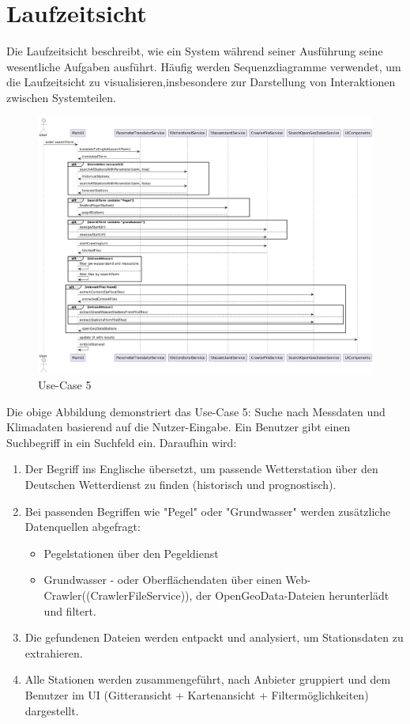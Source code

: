 \documentclass[a4paper,12pt]{scrreprt}
\begin{document}
\section*{\large \textbf{Laufzeitsicht}}
Die Laufzeitsicht beschreibt, wie ein System während seiner Ausführung seine wesentliche Aufgaben ausführt. Häufig werden Sequenzdiagramme verwendet, um die Laufzeitsicht zu visualisieren,insbesondere zur Darstellung von Interaktionen zwischen Systemteilen.
\begin{figure}[H]
	\includegraphics[width=18.5cm]{Such-Algorithmus.png}
	\caption{\label{} Use-Case 5}
\end{figure}
Die obige Abbildung demonstriert das Use-Case 5: Suche nach Messdaten und Klimadaten basierend auf die Nutzer-Eingabe. Ein Benutzer gibt einen Suchbegriff in ein Suchfeld ein. Daraufhin wird:  
\begin{enumerate}
	\item Der Begriff ins Englische übersetzt, um passende Wetterstation über den Deutschen Wetterdienst zu finden (historisch und prognostisch).
	\item Bei passenden Begriffen wie "Pegel" oder "Grundwasser" werden zusätzliche Datenquellen abgefragt:
	\begin{itemize}
		\item Pegelstationen über den Pegeldienst
		\item Grundwasser - oder Oberflächendaten über einen Web-Crawler((CrawlerFileService)), der OpenGeoData-Dateien herunterlädt und filtert.
	\end{itemize}
	\item Die gefundenen Dateien werden entpackt und analysiert, um Stationsdaten zu extrahieren.
	\item Alle Stationen werden zusammengeführt, nach Anbieter gruppiert und dem Benutzer im UI (Gitteransicht + Kartenansicht + Filtermöglichkeiten) dargestellt.
\end{enumerate}
\end{document}
